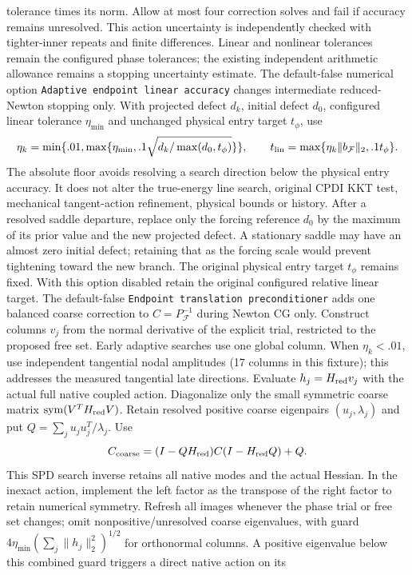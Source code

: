 \documentclass[11pt]{article}
\begin{document}
tolerance times its norm. Allow at most four correction solves and fail if
accuracy remains unresolved. This action uncertainty is independently checked
with tighter-inner repeats and finite differences. Linear and
nonlinear tolerances remain the configured phase tolerances; the existing
independent arithmetic allowance remains a stopping uncertainty estimate.
The default-false numerical option \texttt{Adaptive endpoint linear accuracy}
changes intermediate reduced-Newton stopping only. With projected defect $d_k$,
initial defect $d_0$, configured linear tolerance $\eta_{\min}$ and unchanged
physical entry target $t_\phi$, use
\[
 \eta_k=\min\{.01,\max\{\eta_{\min},.1\sqrt{d_k/\max(d_0,t_\phi)}\}\},\qquad
 t_{\rm lin}=\max\{\eta_k\|b_{\mathcal F}\|_2,.1t_\phi\}.
\]
The absolute floor avoids resolving a search direction below the physical
entry accuracy. It does not alter the true-energy line search, original CPDI
KKT test, mechanical tangent-action refinement, physical bounds or history.
After a resolved saddle departure, replace only the forcing reference $d_0$
by the maximum of its prior value and the new projected defect. A stationary
saddle may have an almost zero initial defect; retaining that as the forcing
scale would prevent tightening toward the new branch. The original physical
entry target $t_\phi$ remains fixed.
With this option disabled retain the original configured relative linear target.
The default-false \texttt{Endpoint translation preconditioner} adds one balanced
coarse correction to $C=P_{\mathcal F}^{-1}$ during Newton CG only. Construct
columns $v_j$ from the normal derivative of the explicit trial, restricted to the
proposed free set. Early adaptive searches use one global column. When
$\eta_k<.01$, use independent tangential nodal amplitudes (17 columns in this
fixture); this addresses the measured tangential late directions. Evaluate
$h_j=H_{\rm red}v_j$ with the actual full native coupled action. Diagonalize only
the small symmetric coarse matrix $\operatorname{sym}(V^TH_{\rm red}V)$.
Retain resolved positive coarse eigenpairs $(u_j,\lambda_j)$ and put
$Q=\sum_j u_ju_j^T/\lambda_j$. Use
\[
 C_{\rm coarse}=(I-QH_{\rm red})C(I-H_{\rm red}Q)+Q.
\]
This SPD search inverse retains all native modes and the actual Hessian. In the
inexact action, implement the left factor as the transpose of the right factor
to retain numerical symmetry. Refresh all images whenever the phase trial or
free set changes; omit nonpositive/unresolved coarse eigenvalues, with guard
$4\eta_{\min}(\sum_j\|h_j\|_2^2)^{1/2}$ for orthonormal columns. A positive
eigenvalue below this combined guard triggers a direct native action on its
\end{document}
